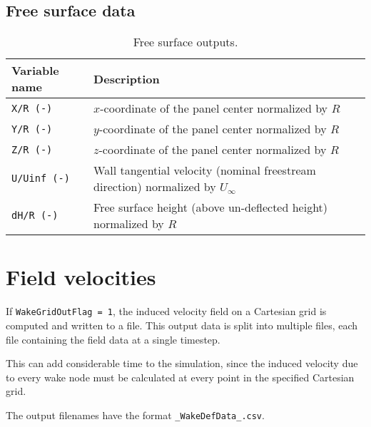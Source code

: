 \subsection{Free surface data}
\begin{table}[!htbp]
\centering
\caption{Free surface outputs.}
\label{tbl:output_free_surface}
\begin{tabular}{p{}p{}}
\toprule
Variable name & Description \\ \midrule
\texttt{X/R (-)}    & $x$-coordinate of the panel center normalized by $R$ \\
\texttt{Y/R (-)}    & $y$-coordinate of the panel center normalized by $R$ \\
\texttt{Z/R (-)}    & $z$-coordinate of the panel center normalized by $R$ \\
\texttt{U/Uinf (-)} & Wall tangential velocity (nominal freestream direction) normalized by $U_\infty$ \\
\texttt{dH/R (-)}   & Free surface height (above un-deflected height) normalized by $R$ \\
\bottomrule
\end{tabular}
\end{table}

\section{Field velocities}
If \texttt{WakeGridOutFlag = 1}, the induced velocity field on a Cartesian grid is computed and written to a file. This output data is split into multiple files, each file containing the field data at a single timestep.

This can add considerable time to the simulation, since the induced velocity due to every wake node must be calculated at every point in the specified Cartesian grid.

The output filenames have the format \texttt{\_WakeDefData\_.csv}.


